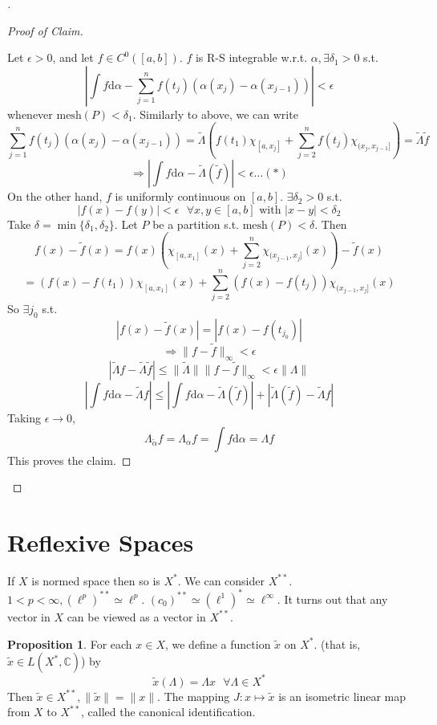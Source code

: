 \documentclass{article}
\newcommand{\sfa}{\text{  } \forall}
\theoremstyle{definition}
\newtheorem{prop}{Proposition}
\newenvironment{proofs}[1][\proofname]{%
  \begin{proof}[#1]$ $\par\nobreak\ignorespaces
}{%
  \end{proof}
}
\begin{document}
\begin{proofs}
	\begin{proofs}[Proof of Claim]
		Let $\epsilon > 0$, and let $f \in C^0([a, b])$.
		$f$ is R-S integrable w.r.t. $\alpha, \exists \delta_1 > 0$ s.t.
		\[
			\left|\int f \mathrm{d} \alpha - \sum_{j = 1}^n f(t_j)(\alpha(x_j) - \alpha(x_{j - 1}))\right| < \epsilon
		\]
		whenever $\text{mesh}(P) < \delta_1$.
		Similarly to above, we can write
		\[
			\sum_{j = 1}^n f(t_j)(\alpha(x_j) - \alpha(x_{j - 1})) = \tilde{\Lambda}\left(f(t_1) \chi_{[a, x_j]} + \sum_{j = 2}^n f(t_j) \chi_{(x_j, x_{j - 1}]}\right) = \tilde{\Lambda} \tilde{f}
		\]
		\[
			\Rightarrow \left|\int f \mathrm{d} \alpha - \tilde{\Lambda}(\tilde{f})\right| < \epsilon ... (*)
		\]
		On the other hand, $f$ is uniformly continuous on $[a ,b]$.
		$\exists \delta_2 > 0$ s.t.
		\[
			|f(x) - f(y) | < \epsilon \sfa x, y \in [a, b] \text{ with }|x - y| < \delta_2
		\]
		Take $\delta = \min\{\delta_1, \delta_2\}$.
		Let $P$ be a partition s.t. $\text{mesh}(P) < \delta$.
		Then
		\[
			f(x) - \tilde{f}(x) =  f(x) \left(\chi_{[a, x_1]}(x) + \sum_{j = 2}^n \chi_{(x_{j - 1}, x_j]}(x)\right) - \tilde{f}(x)
		\]
		\[
			= (f(x) - f(t_1)) \chi_{[a, x_1]}(x) + \sum_{j = 2}^n(f(x) - f(t_j)) \chi_{(x_{j - 1}, x_j]}(x)
		\]
		So $\exists j_0$ s.t.
		\[
			|f(x) - \tilde{f}(x)| = |f(x) - f(t_{j_0})|
		\]
		\[
			\Rightarrow \|f - \tilde{f}\|_{\infty} < \epsilon
		\]
		\[
			|\tilde{\Lambda} f - \tilde{\Lambda}\tilde{f}| \leq \|\tilde{\Lambda}\|\|f - \tilde{f}\|_{\infty} < \epsilon \|\Lambda\|
		\]
		\[
			\left|\int f \mathrm{d} \alpha - \tilde{\Lambda} f\right| \leq \left|\int f \mathrm{d} \alpha - \tilde{\Lambda}(\tilde{f})\right| + |\tilde{\Lambda}(\tilde{f}) - \tilde{\Lambda} f|
		\]
		Taking $\epsilon \to 0$, 
		\[
			\Lambda_{\tilde{\alpha}} f = \Lambda_\alpha f = \int f \mathrm{d} \alpha = \Lambda f
		\]
		This proves the claim.
	\end{proofs}
\end{proofs}

\section*{Reflexive Spaces}

If $X$ is normed space then so is $X^*$.
We can consider $X^{**}$.
$1 < p < \infty, (\ell^p)^{**} \simeq \ell^p$.
$(c_0)^{**} \simeq (\ell^1)^* \simeq \ell^\infty$.
It turns out that any vector in $X$ can be viewed as a vector in $X^{**}$.

\begin{prop}
	For each $x\in X$, we define a function $\tilde{x}$ on $X^*$.
	(that is, $\tilde{x} \in L(X^*, \mathbb{C})$) by 
	\[
		\tilde{x}(\Lambda) = \Lambda x \sfa \Lambda \in X^*
	\]
	Then $\tilde{x} \in X^{**}, \|\tilde{x}\| = \|x\|$.
	The mapping $J:x \mapsto \tilde{x}$ is an isometric linear map from $X$ to $X^{**}$, called the canonical identification.
\end{prop}
\end{document}
